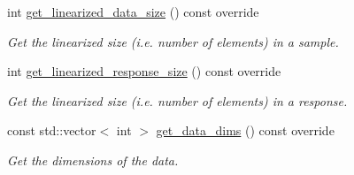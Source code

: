 \begin{DoxyCompactItemize}
\item 
int \hyperlink{classlbann_1_1mesh__reader_a52c9bccdfed2a06f69023755513f4cde}{get\+\_\+linearized\+\_\+data\+\_\+size} () const override
\begin{DoxyCompactList}\small\item\em Get the linearized size (i.\+e. number of elements) in a sample. \end{DoxyCompactList}\item 
int \hyperlink{classlbann_1_1mesh__reader_a52b64ae05dc20d8173e50019e2a3e6ce}{get\+\_\+linearized\+\_\+response\+\_\+size} () const override
\begin{DoxyCompactList}\small\item\em Get the linearized size (i.\+e. number of elements) in a response. \end{DoxyCompactList}\item 
const std\+::vector$<$ int $>$ \hyperlink{classlbann_1_1mesh__reader_a8845023baeb8e9c51f3d690347b1213f}{get\+\_\+data\+\_\+dims} () const override
\begin{DoxyCompactList}\small\item\em Get the dimensions of the data. \end{DoxyCompactList}\end{DoxyCompactItemize}
